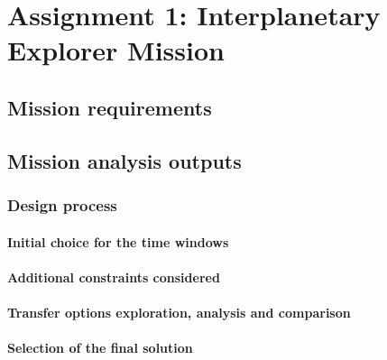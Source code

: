\documentclass[11pt,a4paper]{report}
\begin{document}
{}

\printnomenclature
\tableofcontents

\part{Assignment 1: Interplanetary Explorer Mission}

\chapter{Mission requirements}

\chapter{Mission analysis outputs}

\section{Design process}

\subsection{Initial choice for the time windows}

\subsection{Additional constraints considered}

\subsection{Transfer options exploration, analysis and comparison}

\subsection{Selection of the final solution}
\end{document}
